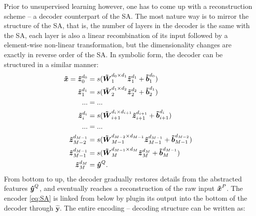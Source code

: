 Prior to unsupervised learning however, one has to come up with a reconstruction scheme -- a decoder counterpart of the SA. The most nature way is to mirror the structure of the SA, that is, the number of layers in the decoder is the same with the SA, each layer is also a linear recombination of its input followed by a element-wise non-linear transformation, but the dimensionality changes are exactly in reverse order of the SA. In symbolic form, the decoder can be structured in a similar manner:
\begin{equation} \label{eq:DC}
\begin{split}
  \boldsymbol{\tilde{x}}=
  \boldsymbol{\tilde{z}}_{0  }^{d_{0  }} &= s(\boldsymbol{\tilde{W}}_{1  }^{d_{0  } \times d_{1  }} \boldsymbol{\tilde{z}}_{1  }^{d_{1  }}+  \boldsymbol{\tilde{b}}_{1  }^{d_{0  }}) \\
  \boldsymbol{\tilde{z}}_{1  }^{d_{1  }} &= s(\boldsymbol{\tilde{W}}_{2  }^{d_{1  } \times d_{2  }} \boldsymbol{\tilde{z}}_{2  }^{d_{2  }} + \boldsymbol{\tilde{b}}_{2  }^{d_{1  }}) \\
  ... &= ... \\
  \boldsymbol{\tilde{z}}_{i  }^{d_{i  }} &= s(\boldsymbol{\tilde{W}}_{i+1}^{d_{i  } \times d_{i+1}} \boldsymbol{\tilde{z}}_{i+1}^{d_{i+1}} + \boldsymbol{\tilde{b}}_{i+1}^{d_{i  }}) \\
  ... &= ... \\
  \boldsymbol{\tilde{z}}_{M-2}^{d_{M-1}} &= s(\boldsymbol{\tilde{W}}_{M-1}^{d_{M-2} \times d_{M-1}} \boldsymbol{\tilde{z}}_{M-1}^{d_{M-1}} + \boldsymbol{\tilde{b}}_{M-1}^{d_{M-2}}) \\
  \boldsymbol{\tilde{z}}_{M-1}^{d_{M-1}} &= s(\boldsymbol{\tilde{W}}_{M  }^{d_{M-1} \times d_{M  }} \boldsymbol{\tilde{z}}_{M  }^{d_{M  }} + \boldsymbol{\tilde{b}}_{M  }^{d_{M-1}}) \\
  \boldsymbol{\tilde{z}}_{M  }^{d_{M  }} &= \boldsymbol{\hat{y}}^Q .
\end{split}
\end{equation}
From bottom to up, the decoder gradually restores details from the abstracted features $\boldsymbol{\hat{y}}^Q$, and eventually reaches a reconstruction of the raw input $\boldsymbol{\tilde{x}}^P$. The encoder \ref{eq:SA} is linked from below by plugin its output into the bottom of the decoder through ${\boldsymbol{\hat{y}}}$. The entire encoding -- decoding structure can be written as:
